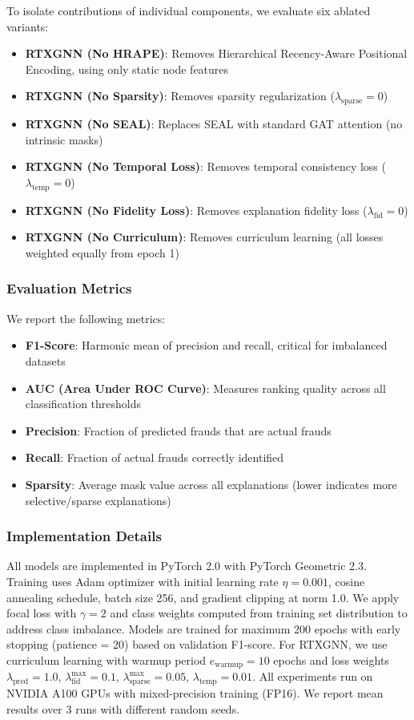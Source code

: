To isolate contributions of individual components, we evaluate six ablated variants:
\begin{itemize}
    \item \textbf{RTXGNN (No HRAPE)}: Removes Hierarchical Recency-Aware Positional Encoding, using only static node features
    \item \textbf{RTXGNN (No Sparsity)}: Removes sparsity regularization ($\lambda_{\text{sparse}} = 0$)
    \item \textbf{RTXGNN (No SEAL)}: Replaces SEAL with standard GAT attention (no intrinsic masks)
    \item \textbf{RTXGNN (No Temporal Loss)}: Removes temporal consistency loss ($\lambda_{\text{temp}} = 0$)
    \item \textbf{RTXGNN (No Fidelity Loss)}: Removes explanation fidelity loss ($\lambda_{\text{fid}} = 0$)
    \item \textbf{RTXGNN (No Curriculum)}: Removes curriculum learning (all losses weighted equally from epoch 1)
\end{itemize}

\subsubsection{Evaluation Metrics}

We report the following metrics:
\begin{itemize}
    \item \textbf{F1-Score}: Harmonic mean of precision and recall, critical for imbalanced datasets
    \item \textbf{AUC (Area Under ROC Curve)}: Measures ranking quality across all classification thresholds
    \item \textbf{Precision}: Fraction of predicted frauds that are actual frauds
    \item \textbf{Recall}: Fraction of actual frauds correctly identified
    \item \textbf{Sparsity}: Average mask value across all explanations (lower indicates more selective/sparse explanations)
\end{itemize}

\subsubsection{Implementation Details}

All models are implemented in PyTorch 2.0 with PyTorch Geometric 2.3. Training uses Adam optimizer with initial learning rate $\eta = 0.001$, cosine annealing schedule, batch size 256, and gradient clipping at norm 1.0. We apply focal loss with $\gamma = 2$ and class weights computed from training set distribution to address class imbalance. Models are trained for maximum 200 epochs with early stopping (patience = 20) based on validation F1-score. For RTXGNN, we use curriculum learning with warmup period $e_{\text{warmup}} = 10$ epochs and loss weights $\lambda_{\text{pred}} = 1.0$, $\lambda_{\text{fid}}^{\max} = 0.1$, $\lambda_{\text{sparse}}^{\max} = 0.05$, $\lambda_{\text{temp}} = 0.01$. All experiments run on NVIDIA A100 GPUs with mixed-precision training (FP16). We report mean results over 3 runs with different random seeds.

